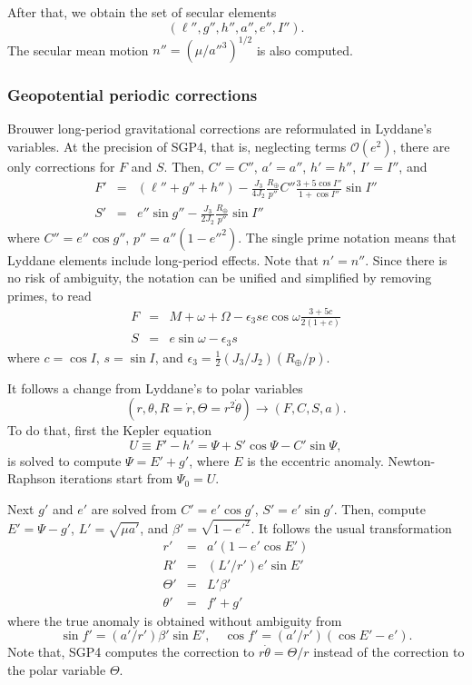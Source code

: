\documentclass{article}
\begin{document}
After that, we obtain the set of secular elements
\[
(\ell'',g'',h'',a'',e'',I'').
\]
The secular mean motion $n''=(\mu/a''^3)^{1/2}$ is also computed.

\subsubsection{Geopotential periodic corrections} \label{s:SGP4lp}


Brouwer long-period gravitational corrections are reformulated in Lyddane's variables. At the precision of SGP4, {\color{red}that is, neglecting terms $\mathcal{O}(e^2)$}, there are only corrections for $F$ and $S$. Then, $C'= C''$, $a'=a''$, $h'=h''$, $I'=I''$, and
\begin{eqnarray*}
F' &=& (\ell''+g''+h'')-\frac{J_3}{4J_2}\frac{R_\oplus}{p''}C''\frac{3+5\cos{I}''}{1+\cos{I}''}\sin{I}'' \\
S' &=&  e''\sin{g}'' -\frac{J_3}{2J_2}\frac{R_\oplus}{p''}\sin{I}''
\end{eqnarray*}
where $C''=e''\cos{g}''$, $p''=a''(1-e''^2)$. The single prime notation means that Lyddane elements include long-period effects. Note that $n'=n''$. Since there is no risk of ambiguity, the notation can be unified and simplified by removing primes, to read
\begin{eqnarray*}
F &=&  M + \omega + \Omega - \epsilon_3 s e \cos{\omega}\frac{3+5c}{2(1+c)} \\
S &=& e\sin{\omega} - \epsilon_3 s
\end{eqnarray*}
where $c=\cos{I}$, $s=\sin{I}$, and $\epsilon_3=\frac{1}{2}(J_3/J_2)(R_\oplus/p)$.

It follows a change from Lyddane's to polar variables
\[
(r,\theta,R=\dot{r},\Theta=r^2\dot\theta)\longrightarrow(F,C,S,a).
\]
To do that, first the Kepler equation
\[
U\equiv{F'-h'}=\Psi+S'\cos\Psi-C'\sin\Psi,
\]
is solved to compute $\Psi=E'+g'$, where $E$ is the eccentric anomaly. Newton-Raphson iterations start from $\Psi_0=U$.

Next $g'$ and $e'$ are solved from $C'=e'\cos{g'}$, $S'=e'\sin{g}'$. Then, compute $E'=\Psi-g'$, $L'=\sqrt{\mu{a}'}$, and $\beta'=\sqrt{1-e'^2}$. It follows the usual transformation
\begin{eqnarray} \label{utor}
r' &=& a'(1-e'\cos{E}') \\
R' &=& (L'/r')e'\sin{E}' \\
\Theta' &=& L'\beta' \\
\theta' &=& f'+g'
\end{eqnarray}
where the true anomaly is obtained without ambiguity from
\begin{equation} \label{utof}
\sin{f}'=(a'/r')\beta'\sin{E}',\quad \cos{f}'=(a'/r')(\cos{E}'-e').
\end{equation}
Note that, SGP4 computes the correction to $r\dot\theta=\Theta/r$ instead of the correction to the polar variable $\Theta$.
\end{document}
